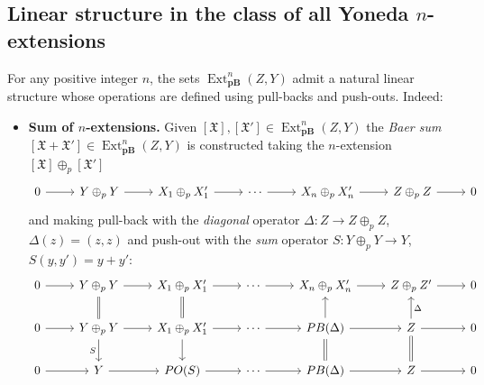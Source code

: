 \documentclass[12pt,a4paper]{amsproc}
\theoremstyle{remark}
\theoremstyle{definition}
\newcommand{\Ext}{\operatorname{Ext}}
\newcommand{\pBan}{\operatorname{\textbf{pB}}}
\numberwithin{equation}{section}
\begin{document}
	\subsection*{Linear structure in the class of all Yoneda $n$-extensions}
    For any positive integer $n$, the sets $\Ext^n_{\boldsymbol{\pBan}}(Z,Y)$ admit a natural linear structure whose operations are defined using pull-backs and push-outs. Indeed:
    \begin{itemize}
        \item[i)] \textbf{Sum of $n$-extensions.} Given $[\mathfrak{X}], \mathfrak{[X']} \in \Ext^n_{\pBan}(Z,Y)$ the \emph{Baer sum} $[\mathfrak{X}+\mathfrak{X'}] \in \Ext^n_{\pBan}(Z,Y)$ is constructed taking the $n$-extension $[\mathfrak{X}] \oplus_p [\mathfrak{X}']$
        \begin{equation}
            \notag
            \begin{tikzcd}
0 \arrow[r] & Y \oplus_pY \arrow[r] & X_1 \oplus_p X'_1 \arrow[r] & \cdots \arrow[r] & X_n \oplus_p X'_n \arrow[r] & Z\oplus_pZ \arrow[r] & 0
\end{tikzcd}
        \end{equation}
        and making pull-back with the \emph{diagonal} operator $\Delta: Z \to Z \oplus_p Z$, $\Delta(z) = (z,z)$ and push-out with the \emph{sum} operator $S: Y \oplus_p Y \to Y$, $S(y,y') = y+y'$:
        \begin{equation}
            \label{Baersum}
            \begin{tikzcd}
0 \arrow[r] & Y \oplus_pY \arrow[r]                                                & X_1 \oplus_p X'_1 \arrow[r]                                          & \cdots \arrow[r] & X_n \oplus_p X'_n \arrow[r]                                   & Z\oplus_pZ' \arrow[r]                                           & 0 \\
0 \arrow[r] & Y \oplus_pY \arrow[r] \arrow[u, equal] \arrow[d, "S"'] & X_1 \oplus_p X'_1 \arrow[r] \arrow[u, equal] \arrow[d] & \cdots \arrow[r] & PB(\Delta) \arrow[r] \arrow[u] \arrow[d, equal] & Z \arrow[u, "\Delta"'] \arrow[r] \arrow[d, equal] & 0 \\
0 \arrow[r] & Y \arrow[r]                                                          & PO(S) \arrow[r]                                                      & \cdots \arrow[r] & PB(\Delta) \arrow[r]                                          & Z \arrow[r]                                                     & 0
\end{tikzcd}
        \end{equation}

\end{itemize}
\end{document}
